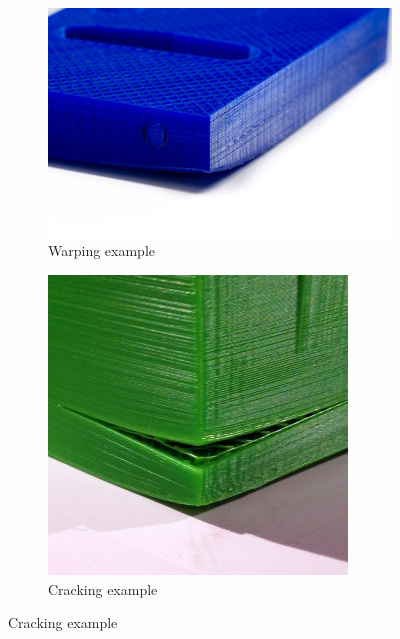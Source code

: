 \documentclass[11pt,a4paper]{article}
\begin{document}
\begin{figure}[H]
    \centering
    \begin{subfigure}[b]{0.4\textwidth}
        \includegraphics[width=\textwidth,cfbox=azul_marcos 4pt 0pt]{FOTOS/EJEMPLO_WARPING}
	\caption*{Warping example}
    \end{subfigure}
    \qquad %
    \begin{subfigure}[b]{0.4\textwidth}
        \includegraphics[width=\textwidth,cfbox=azul_marcos 4pt 0pt]{FOTOS/EJEMPLO_CRACKING}
	\caption*{Cracking example}
    \end{subfigure}   
\end{figure}
\end{document}
